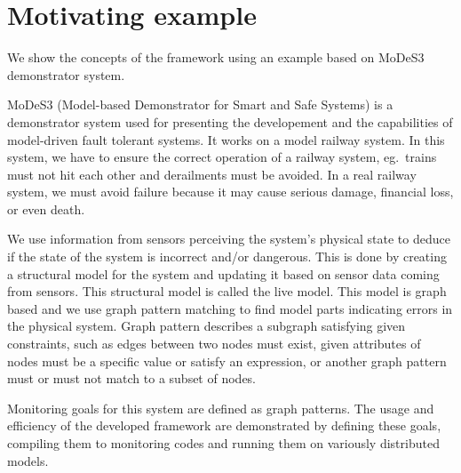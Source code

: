 \chapter{Motivating example}


We show the concepts of the framework using an example based on MoDeS3~\cite{modes3} demonstrator system. 

MoDeS3 (Model-based Demonstrator for Smart and Safe Systems) is a demonstrator system used for presenting the developement and the capabilities of model-driven fault tolerant systems.
It works on a model railway system. In this system, we have to ensure the correct operation of a railway system, eg.\ trains must not hit each other and derailments must be avoided. In a real railway system, we must avoid failure because it may cause serious damage, financial loss, or even death.

We use information from sensors perceiving the system's physical state to deduce if the state of the system is incorrect and/or dangerous. This is done by creating a structural model for the system and updating it based on sensor data coming from sensors. This structural model is called the live model. This model is graph based and we use graph pattern matching to find model parts indicating errors in the physical system. Graph pattern describes a subgraph satisfying given constraints, such as edges between two nodes must exist, given attributes of nodes must be a specific value or satisfy an expression, or another graph pattern must or must not match to a subset of nodes.

Monitoring goals for this system are defined as graph patterns. The usage and efficiency of the developed framework are demonstrated by defining these goals, compiling them to monitoring codes and running them on variously distributed models.

 



